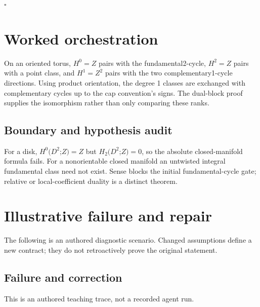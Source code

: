 \documentclass[preprint,12pt,aps,pra,showkeys,amsmath,amssymb,superscriptaddress,floatfix]{revtex4-2}
\theoremstyle{definition}
\theoremstyle{remark}
\begin{document}
\hfill$\square$

\section{Worked orchestration}

On an oriented torus, \(H^{0}=Z\) pairs with the fundamental2-cycle,
\(H^{2}=Z\) pairs with a point class, and \(H^{1}=Z^{2}\) pairs with the
two complementary1-cycle directions. Using product orientation, the
degree 1 classes are exchanged with complementary cycles up to the cap
convention's signs. The dual-block proof supplies the isomorphism rather
than only comparing these ranks.

\subsection{Boundary and hypothesis audit}

For a disk, \(H^{0}(D^{2}\);\(Z)=Z\) but \(H_{2}(D^{2}\);\(Z)=0\), so
the absolute closed-manifold formula fails. For a nonorientable closed
manifold an untwisted integral fundamental class need not exist. Sense
blocks the initial fundamental-cycle gate; relative or local-coefficient
duality is a distinct theorem.

\section{Illustrative failure and repair}

The following is an authored diagnostic scenario. Changed assumptions
define a new contract; they do not retroactively prove the original
statement.

\subsection{Failure and correction}
This is an authored teaching trace, not a recorded agent run.
\end{document}

